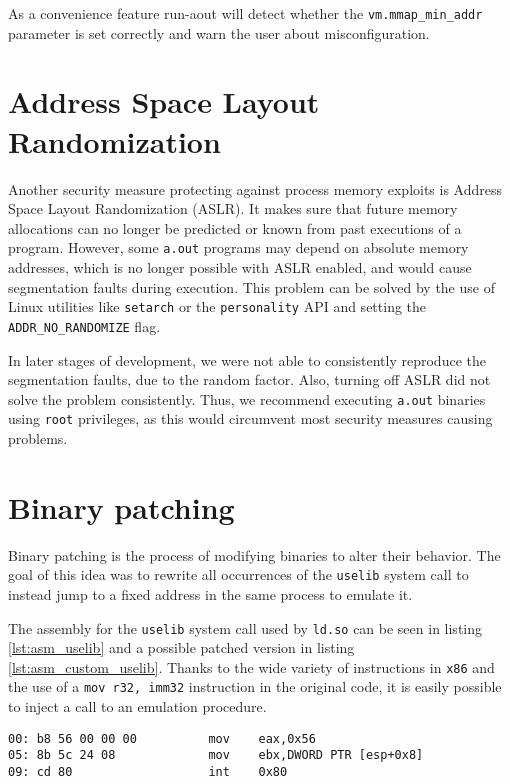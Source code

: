 \documentclass[draft,final]{vutinfth} %
\begin{document}
As a convenience feature run-aout will detect whether the \texttt{vm.mmap\_min\_addr} parameter is set correctly and warn the user about misconfiguration.

\section{Address Space Layout Randomization}
\label{explore_aslr}

Another security measure protecting against process memory exploits is Address Space Layout Randomization (ASLR). It makes sure that future memory allocations can no longer be predicted or known from past executions of a program. However, some \texttt{a.out} programs may depend on absolute memory addresses, which is no longer possible with ASLR enabled, and would cause segmentation faults during execution. This problem can be solved by the use of Linux utilities like \texttt{setarch} or the \texttt{personality} API and setting the \texttt{ADDR\_NO\_RANDOMIZE} flag.

In later stages of development, we were not able to consistently reproduce the segmentation faults, due to the random factor. Also, turning off ASLR did not solve the problem consistently. Thus, we recommend executing \texttt{a.out} binaries using \texttt{root} privileges, as this would circumvent most security measures causing problems.

\section{Binary patching}
\label{explore_binpatch}

Binary patching is the process of modifying binaries to alter their behavior. The goal of this idea was to rewrite all occurrences of the \texttt{uselib} system call to instead jump to a fixed address in the same process to emulate it.

The assembly for the \texttt{uselib} system call used by \texttt{ld.so} can be seen in listing \ref{lst:asm_uselib} and a possible patched version in listing \ref{lst:asm_custom_uselib}. Thanks to the wide variety of instructions in \texttt{x86} and the use of a \texttt{mov r32, imm32} instruction in the original code, it is easily possible to inject a call to an emulation procedure.

\begin{lstlisting}[caption={Assembly for the invocation of the \texttt{uselib} system call as used by \texttt{ld.so}}, label={lst:asm_uselib}]
00:	b8 56 00 00 00       	mov    eax,0x56
05:	8b 5c 24 08          	mov    ebx,DWORD PTR [esp+0x8]
09:	cd 80                	int    0x80
\end{lstlisting}
\end{document}
